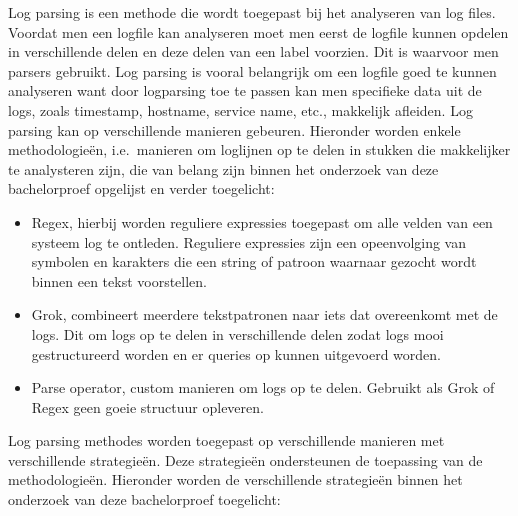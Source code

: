 Log parsing is een methode die wordt toegepast bij het analyseren van log files. Voordat men een logfile kan analyseren moet men eerst de logfile kunnen opdelen in verschillende delen en deze delen van een label voorzien. Dit is waarvoor men parsers gebruikt. Log parsing is vooral belangrijk om een logfile goed te kunnen analyseren want door logparsing toe te passen kan men specifieke data uit de logs, zoals timestamp, hostname, service name, etc., makkelijk afleiden. Log parsing kan op verschillende manieren gebeuren. Hieronder worden enkele methodologieën, i.e.\ manieren om loglijnen op te delen in stukken die makkelijker te analysteren zijn, die van belang zijn binnen het onderzoek van deze bachelorproef opgelijst en verder toegelicht:
\begin{itemize}
    \item Regex, hierbij worden reguliere expressies toegepast om alle velden van een systeem log te ontleden. Reguliere expressies zijn een opeenvolging van symbolen en karakters die een string of patroon waarnaar gezocht wordt binnen een tekst voorstellen.
    \item Grok, combineert meerdere tekstpatronen naar iets dat overeenkomt met de logs. Dit om logs op te delen in verschillende delen zodat logs mooi gestructureerd worden en er queries op kunnen uitgevoerd worden.
    \item Parse operator, custom manieren om logs op te delen. Gebruikt als Grok of Regex geen goeie structuur opleveren.
\end{itemize}
Log parsing methodes worden toegepast op verschillende manieren met verschillende strategieën. Deze strategieën ondersteunen de toepassing van de methodologieën. Hieronder worden de verschillende strategieën binnen het onderzoek van deze bachelorproef toegelicht:
